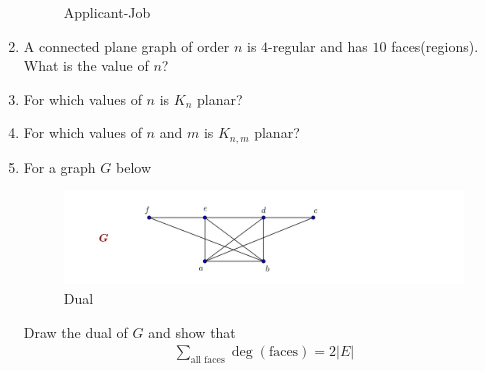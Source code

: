 \documentclass[paper=a4, fontsize=11pt,twoside]{scrartcl}		%
\theoremstyle{definition}
\theoremstyle{remark}
\begin{document}
\begin{enumerate}
\begin{figure}[hbt!]
\caption{Applicant-Job}\label{fig6}
\end{figure}
  \item A connected plane graph of order $n$ is $4$-regular and has $10$ faces(regions). What is the value of $n$?
  \item For which values of $n$ is $K_n$ planar?
  \item For which values of $n$ and $m$ is $K_{n,m}$ planar?
  \item For a graph $G$ below
  \begin{figure}[hbt!]
\centering
\includegraphics[width=1.0\textwidth]{GrapAss7.png}
\caption{Dual}\label{fig7}
\end{figure}

Draw the dual of $G$ and show that
  \begin{align*}
  \sum_{\text{all faces}}\deg(\text{faces})=2|E|
  \end{align*}
\end{enumerate}
\end{document}
